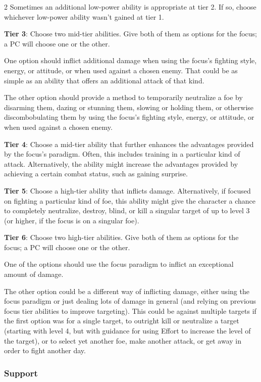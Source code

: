 \begin{multicols}{2}
Sometimes an additional low-power ability is appropriate at tier 2. If so, choose whichever
low-power ability wasn’t gained at tier 1.

\textbf{Tier 3}: Choose two mid-tier abilities. Give both of them as options for the focus; a PC will choose one or the other.

One option should inflict additional damage when using the focus’s fighting style, energy, or attitude, or when used against a chosen enemy. That could be as simple as an ability that offers an additional attack of that kind.

The other option should provide a method to temporarily neutralize a foe by disarming them, dazing or stunning them, slowing or holding them, or otherwise discombobulating them by using the focus’s fighting style, energy, or attitude, or when used against a chosen enemy.

\textbf{Tier 4}: Choose a mid-tier ability that further enhances the advantages provided by the focus’s paradigm. Often, this includes training in a particular kind of attack. Alternatively, the ability might increase the advantages provided by achieving a certain combat status, such as gaining surprise.

\textbf{Tier 5}: Choose a high-tier ability that inflicts damage. Alternatively, if focused on fighting a particular kind of foe, this ability might give the character a chance to completely neutralize, destroy, blind, or kill a singular target of up to level 3 (or higher, if the focus is on a singular foe).

\textbf{Tier 6}: Choose two high-tier abilities. Give both of them as options for the focus; a PC will choose one or the other.

One of the options should use the focus paradigm to inflict an exceptional amount of damage. 

The other option could be a different way of inflicting damage, either using the focus paradigm or just dealing lots of damage in general (and relying on previous focus tier abilities to improve targeting). This could be against multiple targets if the first option was for a single target, to outright kill or neutralize a target (starting with level 4, but with guidance for using Effort to increase the level of the target), or to select yet another foe, make another attack, or get away in order to fight another day.

\subsubsection{Support}


\end{multicols}

